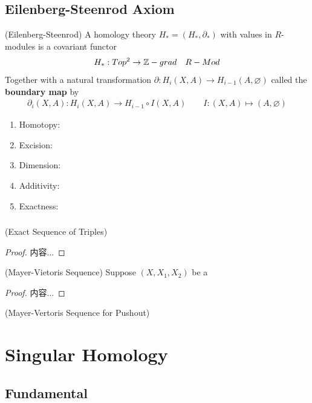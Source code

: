 \documentclass[Total.tex]{subfiles}
\begin{document}
		\section{Eilenberg-Steenrod Axiom}
		\begin{axiom}
			(Eilenberg-Steenrod) A homology theory $H_*=(H_*,\partial_*)$ with values in $R$-modules is a covariant functor
			\begin{gather*}
				H_*:Top^2\rightarrow \mathbb{Z}-grad\quad R-Mod
			\end{gather*}
			Together with a natural transformation $\partial:H_i(X,A)\rightarrow H_{i-1}(A,\varnothing)$ called the \textbf{boundary map} by 
			\begin{gather*}
				\partial_i(X,A):H_i(X,A)\rightarrow H_{i-1}\circ I(X,A)\qquad I:(X,A)\mapsto (A,\varnothing)
			\end{gather*}
			\begin{enumerate}
				\item Homotopy:
				\item Excision:
				\item Dimension:
				\item Additivity:
				\item Exactness:
			\end{enumerate}
		\end{axiom}
		\subsection{}
			\begin{lemma}
				(Exact Sequence of Triples)
			\end{lemma}
			\begin{proof}
				内容...
			\end{proof}
			
			\begin{theorem}
				(Mayer-Vietoris Sequence) Suppose $(X,X_1,X_2)$ be a 
			\end{theorem}
			\begin{proof}
				内容...
			\end{proof}
			
			\begin{corollary}
				(Mayer-Vertoris Sequence for Pushout)
			\end{corollary}
	\chapter{Singular Homology}
		\section{Fundamental}
		
\end{document}
